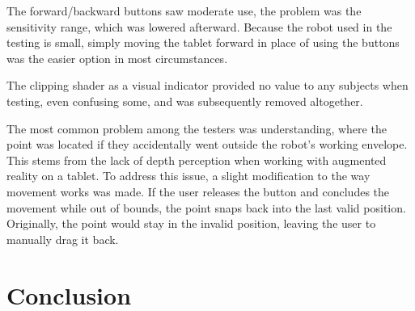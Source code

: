 The forward/backward buttons saw moderate use, the problem was the sensitivity range, which was lowered afterward. Because the robot used in the testing is small, simply moving the tablet forward in place of using the buttons was the easier option in most circumstances.

The clipping shader as a visual indicator provided no value to any subjects when testing, even confusing some, and was subsequently removed altogether.

The most common problem among the testers was understanding, where the point was located if they accidentally went outside the robot's working envelope. This stems from the lack of depth perception when working with augmented reality on a tablet. To address this issue, a slight modification to the way movement works was made. If the user releases the button and concludes the movement while out of bounds, the point snaps back into the last valid position. Originally, the point would stay in the invalid position, leaving the user to manually drag it back. 

\chapter{Conclusion}